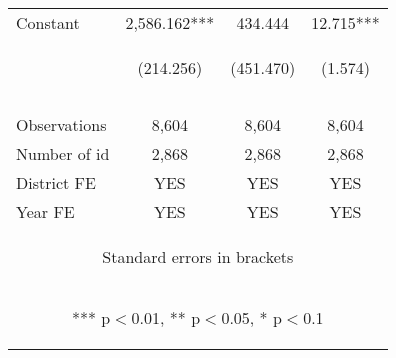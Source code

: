 \begin{center}
\begin{tabular}{lccc}
Constant & 2,586.162*** & 434.444 & 12.715*** \\
 & \begin{footnotesize}(214.256)\end{footnotesize} & \begin{footnotesize}(451.470)\end{footnotesize} & \begin{footnotesize}(1.574)\end{footnotesize} \\
 & \begin{footnotesize}[0.000]\end{footnotesize} & \begin{footnotesize}[0.336]\end{footnotesize} & \begin{footnotesize}[0.000]\end{footnotesize} \\
\vspace{4pt} & \begin{footnotesize}\end{footnotesize} & \begin{footnotesize}\end{footnotesize} & \begin{footnotesize}\end{footnotesize} \\
Observations & 8,604 & 8,604 & 8,604 \\
Number of id & 2,868 & 2,868 & 2,868 \\
District FE & YES & YES & YES \\
 Year FE & YES & YES & YES \\ \hline
\multicolumn{4}{c}{\begin{footnotesize} Standard errors in brackets\end{footnotesize}} \\
\multicolumn{4}{c}{\begin{footnotesize} *** p$<$0.01, ** p$<$0.05, * p$<$0.1\end{footnotesize}} \\
\end{tabular}
\end{center}
